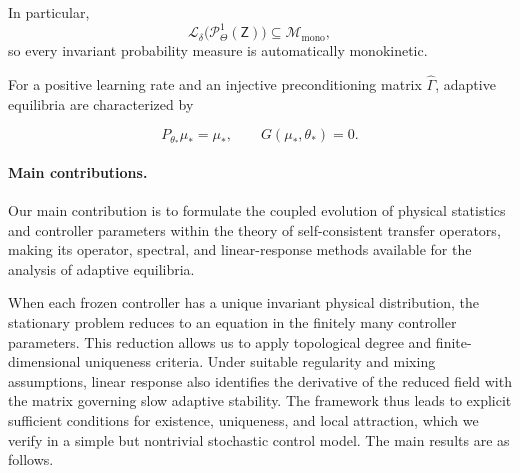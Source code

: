 \documentclass[11pt]{article}
\theoremstyle{definition}
\theoremstyle{remark}
\newcommand{\ProbThetaOne}{\mathcal{P}_{\Theta}^{1}}
\newcommand{\STO}{\mathcal{L}}
\newcommand{\Z}{\mathsf{Z}}
\newcommand{\Mmono}{\mathscr{M}_{\mathrm{mono}}}
\begin{document}
 In particular,
\[
  \STO_\delta\bigl(\ProbThetaOne(\Z)\bigr)
  \subseteq\Mmono,
\]
so every invariant probability measure is automatically monokinetic. 


For a positive learning rate and an injective preconditioning
matrix $\widehat\Gamma$, adaptive equilibria are characterized by

\begin{equation}
 P_{\theta_*}\mu_*=\mu_* ,
  \qquad
  G(\mu_*,\theta_*)=0.
  \label{eq:intro-equilibrium-system}
\end{equation}



\paragraph{Main contributions.}
Our main contribution is to formulate the coupled evolution
of physical statistics and controller parameters within
the theory of self-consistent transfer operators, making
its operator, spectral, and linear-response methods
available for the analysis of adaptive equilibria.

When each frozen controller has a unique invariant physical
distribution, the stationary problem reduces to an equation
in the finitely many controller parameters. This reduction
allows us to apply topological degree and finite-dimensional
uniqueness criteria. Under suitable regularity and mixing
assumptions, linear response also identifies the derivative
of the reduced field with the matrix governing slow adaptive
stability. The framework thus leads to explicit sufficient
conditions for existence, uniqueness, and local attraction,
which we verify in a simple but nontrivial stochastic
control model. The main results are as follows.
\end{document}
